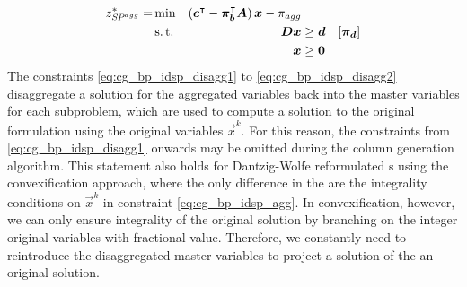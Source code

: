 \begin{equation}
\begin{aligned}
z^*_\SP{agg} = &\min & \left( \vec{c}\transpose - \vec{\pi}_\vec{b}\transpose \mat{A} \right) \vec{x} - \pi_{agg} & & \\
&\st & \mat{D} \vec{x} & \geq \vec{d} & \left[\vec{\pi}_\vec{d}\right] \\
&& \vec{x} & \geq \vec{0}
\end{aligned}
\end{equation}
The constraints \eqref{eq:cg_bp_idsp_disagg1} to \eqref{eq:cg_bp_idsp_disagg2} disaggregate a solution for the aggregated variables back into the master variables for each subproblem, which are used to compute a solution to the original formulation using the original variables $\vec{x}^k$. For this reason, the constraints from \eqref{eq:cg_bp_idsp_disagg1} onwards may be omitted during the column generation algorithm. This statement also holds for Dantzig-Wolfe reformulated \IP{}s using the convexification approach, where the only difference in the \MP{} are the integrality conditions on $\vec{x}^k$ in constraint \eqref{eq:cg_bp_idsp_agg}. In convexification, however, we can only ensure integrality of the original solution by branching on the integer original variables with fractional value. Therefore, we constantly need to reintroduce the disaggregated master variables to project a solution of the \RMP{} an original solution.

